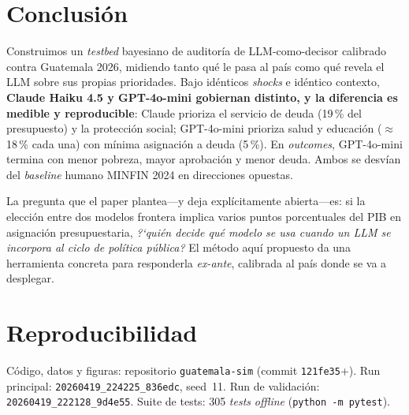 \documentclass[conference]{IEEEtran}
\begin{document}
\section{Conclusi\'on}

Construimos un \emph{testbed} bayesiano de auditor\'ia de
LLM-como-decisor calibrado contra Guatemala 2026, midiendo tanto qu\'e
le pasa al pa\'is como qu\'e revela el LLM sobre sus propias
prioridades. Bajo id\'enticos \emph{shocks} e id\'entico contexto,
\textbf{Claude Haiku 4.5 y GPT-4o-mini gobiernan distinto, y la
diferencia es medible y reproducible}: Claude prioriza el servicio
de deuda (19\,\% del presupuesto) y la protecci\'on social;
GPT-4o-mini prioriza salud y educaci\'on ($\approx$\,18\,\% cada una)
con m\'inima asignaci\'on a deuda (5\,\%). En \emph{outcomes},
GPT-4o-mini termina con menor pobreza, mayor aprobaci\'on y menor
deuda. Ambos se desv\'ian del \emph{baseline} humano MINFIN 2024 en
direcciones opuestas.

La pregunta que el paper plantea---y deja expl\'icitamente
abierta---es: si la elecci\'on entre dos modelos frontera implica
varios puntos porcentuales del PIB en asignaci\'on presupuestaria,
\emph{?`qui\'en decide qu\'e modelo se usa cuando un LLM se incorpora
al ciclo de pol\'itica p\'ublica?} El m\'etodo aqu\'i propuesto da una
herramienta concreta para responderla \emph{ex-ante}, calibrada al
pa\'is donde se va a desplegar.

\section*{Reproducibilidad}

C\'odigo, datos y figuras: repositorio \texttt{guatemala-sim} (commit
\texttt{121fe35}+). Run principal:
\texttt{20260419\_224225\_836edc}, seed~11. Run de validaci\'on:
\texttt{20260419\_222128\_9d4e55}. Suite de tests: 305 \emph{tests}
\emph{offline} (\texttt{python -m pytest}).
\end{document}
